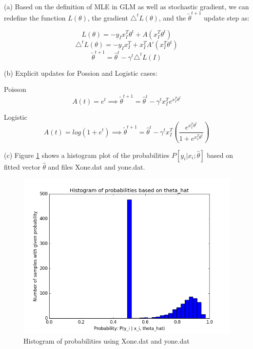 \documentclass[11pt]{article}
\newenvironment{problem}[2][Problem]{\begin{trivlist}
\item[\hskip \labelsep {\bfseries #1}\hskip \labelsep {\bfseries #2.}]}{\end{trivlist}}
\begin{document}
\begin{problem}{2.4}
\text{ }\\

(a) Based on the definition of MLE in GLM as well as stochastic gradient, we can redefine the function $L(\theta)$, the gradient $\triangle^{t} L(\theta)$, and the $\tilde{\theta}^{t+1}$ update step as:

\[L(\theta) = -y_{I}x^{T}_{I}\theta^{t} + A(x^{T}_{I}\theta^{t})\]
\[\triangle^{t}L(\theta) = -y_{I}x^{T}_{I} + x^{T}_{I}A'(x^{T}_{I}\theta^{t})\]
\[\tilde{\theta}^{t+1} = \hat{\theta}^{t} - \gamma^{t} \triangle^{t}L(I)\]

(b) Explicit updates for Possion and Logistic cases:

Poisson
\[A(t) = e^{t} \implies \tilde{\theta}^{t+1} = \hat{\theta}^{t} - \gamma^{t} x^{T}_{I}e^{x^{T}_{I}\theta^{t}}\]

Logistic
\[A(t) = log(1+e^{t}) \implies \tilde{\theta}^{t+1} = \hat{\theta}^{t} - \gamma^{t} x^{T}_{I}(\frac{e^{x^{T}_{I}\theta^{t}}}{1+e^{x^{T}_{I}\theta^{t}}})\]

(c) Figure \ref{fig:4c} shows a histogram plot of the probabilities $P[y_i | x_i;\hat{\theta}]$  based on fitted vector $\hat{\theta}$ and files Xone.dat and yone.dat.
\begin{figure}[h!]
  \centering
  \includegraphics[scale=0.5]{figs/4c.png}
  \caption{Histogram of probabilities using Xone.dat and yone.dat}
  \label{fig:4c}
\end{figure}


\end{problem}
\end{document}
